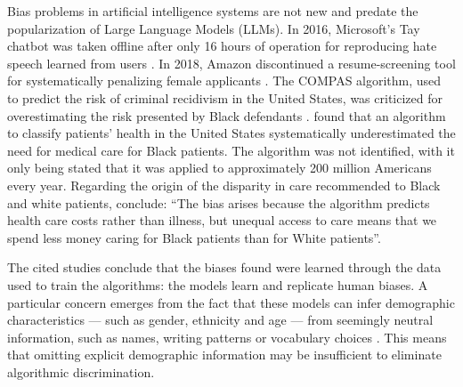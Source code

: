\documentclass[12pt,a4paper]{article}
\begin{document}
Bias problems in artificial intelligence systems are not new and predate the popularization of Large Language Models (LLMs). In 2016, Microsoft's Tay chatbot was taken offline after only 16 hours of operation for reproducing hate speech learned from users \citep{wolf2017}.
In 2018, Amazon discontinued a resume-screening tool for systematically penalizing female applicants \citep{dastin2018}. The
COMPAS algorithm, used to predict the risk of criminal recidivism in the United States, was criticized for overestimating the risk presented by Black defendants \citep{angwin2016}. \citet{obermeyer2019} found that an algorithm to classify patients' health in the United States systematically underestimated the need for medical care for Black patients. The algorithm was not identified, with it only being stated that it was applied to approximately 200 million Americans every year. Regarding the origin of the disparity in care recommended to Black and white patients, \citet[p.~447]{obermeyer2019} conclude:
``The bias arises because the algorithm predicts health care costs rather than illness, but unequal access to care means that we spend less money caring for Black patients than for White patients''.

The cited studies conclude that the biases found were learned through the data used to train the algorithms: the models learn and replicate human biases. A particular concern emerges from the fact that these models can infer demographic characteristics
--- such as gender, ethnicity and age --- from seemingly neutral information, such as names, writing patterns or vocabulary choices \citep{bai2024}. This means that omitting explicit demographic information may be insufficient to eliminate algorithmic discrimination.
\end{document}
